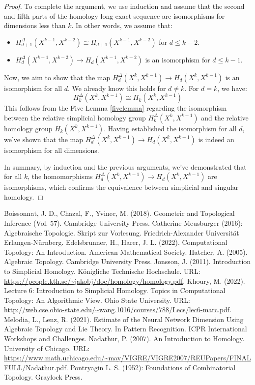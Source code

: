 \documentclass{amsart}
\begin{document}
\begin{proof}
To complete the argument, we use induction and assume that the second and fifth parts of the homology long exact sequence are isomorphisms for dimensions less than $k$. In other words, we assume that:
\begin{itemize}
	\item $H_{d+1}^\Delta(X^{k-1}, X^{k-2}) \cong H_{d+1}(X^{k-1}, X^{k-2})$ for $d \leq k-2$.
	\item $H_d^\Delta(X^{k-1}, X^{k-2}) \rightarrow H_d(X^{k-1}, X^{k-2})$ is an isomorphism for $d \leq k-1$.
\end{itemize}
Now, we aim to show that the map $H_d^\Delta(X^k, X^{k-1}) \rightarrow H_d(X^k, X^{k-1})$ is an isomorphism for all $d$. We already know this holds for $d \neq k$. For $d = k$, we have:
\begin{equation}
H_k^\Delta(X^k,X^{k-1}) \cong H_k(X^k,X^{k-1})
\end{equation}
This follows from the Five Lemma \ref{fivelemma} regarding the isomorphism between the relative simplicial homology group $H_k^\Delta(X^k, X^{k-1})$ and the relative homology group $H_k(X^k, X^{k-1})$. Having established the isomorphism for all $d$, we've shown that the map 
$H_d^\Delta(X^k, X^{k-1}) \rightarrow H_d(X^k, X^{k-1})$ is indeed an isomorphism for all dimensions.

In summary, by induction and the previous arguments, we've demonstrated that for all $k$, the homomorphisms $H_d^\Delta(X^k, X^{k-1}) \rightarrow H_d(X^k, X^{k-1})$ are isomorphisms, which confirms the equivalence between simplicial and singular homology.
\end{proof}

\begin{thebibliography}{100}
 Boissonnat, J. D., Chazal, F., Yvinec, M. (2018). Geometric and Topological Inference (Vol. 57). Cambridge University Press.
 Catherine Meusburger (2016): Algebraische Topologie. Skript zur Vorlesung. Friedrich-Alexander Universität Erlangen-Nürnberg.
 Edelsbrunner, H., Harer, J. L. (2022). Computational Topology: An Introduction. American Mathematical Society.
 Hatcher, A. (2005). Algebraic Topology. Cambridge University Press.
 Jonsson, J. (2011). Introduction to Simplicial Homology. Königliche Technische Hochschule. URL: \url{https://people.kth.se/~jakobj/doc/homology/homology.pdf}.
 Khoury, M. (2022). Lecture 6: Introduction to Simplicial Homology. Topics in Computational Topology: An Algorithmic View. Ohio State University. URL: \url{http://web.cse.ohio-state.edu/~wang.1016/courses/788/Lecs/lec6-marc.pdf}.
 Melodia, L., Lenz, R. (2021). Estimate of the Neural Network Dimension Using Algebraic Topology and Lie Theory. In Pattern Recognition. ICPR International Workshops and Challenges.
 Nadathur, P. (2007). An Introduction to Homology. University of Chicago. URL: \url{https://www.math.uchicago.edu/~may/VIGRE/VIGRE2007/REUPapers/FINALFULL/Nadathur.pdf}.
 Pontryagin L. S. (1952): Foundations of Combinatorial Topology. Graylock Press.
\end{thebibliography}
\end{document}
